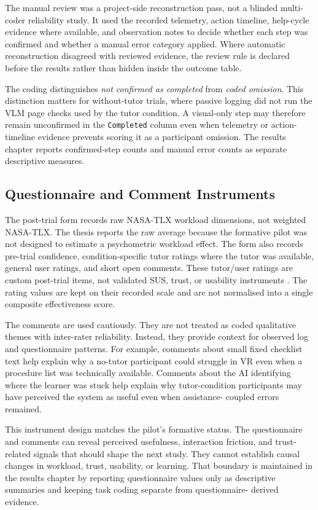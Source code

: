 The manual review was a project-side reconstruction pass, not a blinded
multi-coder reliability study. It used the recorded telemetry, action
timeline, help-cycle evidence where available, and observation notes to decide
whether each step was confirmed and whether a manual error category applied.
Where automatic reconstruction disagreed with reviewed evidence, the review
rule is declared before the results rather than hidden inside the outcome
table.

The coding distinguishes \emph{not confirmed as completed} from \emph{coded
omission}. This distinction matters for without-tutor trials, where passive
logging did not run the VLM page checks used by the tutor condition. A
visual-only step may therefore remain unconfirmed in the \texttt{Completed}
column even when telemetry or action-timeline evidence prevents scoring it as
a participant omission. The results chapter reports confirmed-step counts and
manual error counts as separate descriptive measures.

\subsection{Questionnaire and Comment Instruments}

The post-trial form records raw NASA-TLX workload dimensions, not weighted
NASA-TLX. The thesis reports the raw average because the formative pilot was
not designed to estimate a psychometric workload effect. The form also records
pre-trial confidence, condition-specific tutor ratings where the tutor was
available, general user ratings, and short open comments. These tutor/user
ratings are custom post-trial items, not validated SUS, trust, or usability
instruments \citep{lee2004trust,visser2023trust}. The rating values are kept on
their recorded scale and are not normalised into a single composite
effectiveness score.

The comments are used cautiously. They are not treated as coded qualitative
themes with inter-rater reliability. Instead, they provide context for
observed log and questionnaire patterns. For example, comments about small
fixed checklist text help explain why a no-tutor participant could struggle in
VR even when a procedure list was technically available. Comments about the AI
identifying where the learner was stuck help explain why tutor-condition
participants may have perceived the system as useful even when assistance-
coupled errors remained.

This instrument design matches the pilot's formative status. The questionnaire
and comments can reveal perceived usefulness, interaction friction, and
trust-related signals that should shape the next study. They cannot establish
causal changes in workload, trust, usability, or learning. That boundary is
maintained in the results chapter by reporting questionnaire values only as
descriptive summaries and keeping task coding separate from questionnaire-
derived evidence.

